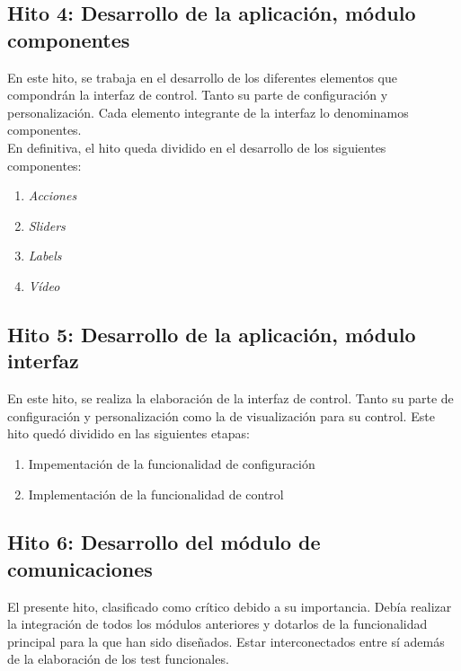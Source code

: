 \subsection{ Hito 4: Desarrollo de la aplicación, módulo componentes }
\label{subsec:hito4}

En este hito, se trabaja en el desarrollo de los diferentes elementos que compondrán la interfaz de control. Tanto su parte de configuración y personalización. 
Cada elemento integrante de la interfaz lo denominamos componentes.\\

En definitiva, el hito queda dividido en el desarrollo de los siguientes componentes:

\begin{enumerate}
 \item \emph{Acciones}
 \item \emph{Sliders}
 \item \emph{Labels}
 \item \emph{Vídeo}
\end{enumerate}


\subsection{Hito 5: Desarrollo de la aplicación, módulo interfaz }
\label{subsec:hito5}

En este hito, se realiza la elaboración de la interfaz de control. Tanto su parte de configuración y personalización como la de visualización para su control. Este hito quedó dividido 
en las siguientes etapas:

\begin{enumerate}
 \item Impementación de la funcionalidad de configuración
 \item Implementación de la funcionalidad de control
\end{enumerate}


\subsection{Hito 6: Desarrollo del módulo de comunicaciones }
\label{subsec:hito6}

El presente hito, clasificado como crítico debido a su importancia. Debía realizar la integración de todos los módulos anteriores y dotarlos de la funcionalidad principal para la que han sido diseñados. Estar interconectados 
entre sí además de la elaboración de los test funcionales.

